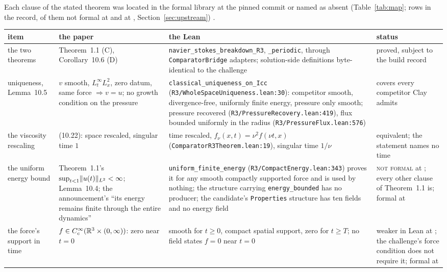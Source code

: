 \documentclass[11pt]{article}
\newcommand{\lean}[1]{\texttt{#1}}
\newcommand{\Lp}[1]{L^{#1}}
\begin{document}
Each clause of the stated theorem was located in the formal library at the pinned commit or
named as absent (Table~\ref{tab:map}; \PaperVsLeanRows{} rows in the record,
\PaperClausesNotFormal{} of them not formal at \lean{\LeanCommit} and
\PaperClausesNotFormalAtHead{} at \lean{\UpCommit}, Section~\ref{sec:upstream}) \cite{Records}.

\begin{table}[t]\centering\footnotesize
\begin{tabular}{L{2.5cm}L{4.0cm}L{5.6cm}L{2.4cm}}\toprule
item & the paper & the Lean & status\\\midrule
the two theorems & Theorem~1.1 (C), Corollary~10.6 (D) & \lean{navier\_stokes\_breakdown\_R3}, \lean{\_periodic}, through \lean{ComparatorBridge} adapters; solution-side definitions byte-identical to the challenge & proved, subject to the build record \\
uniqueness, Lemma~10.5 & $v$ smooth, $\Lp\infty_t\Lp2_x$, zero datum, same force $\Rightarrow v=u$; no growth condition on the pressure & \lean{classical\_uniqueness\_on\_Icc} (\lean{R3/WholeSpaceUniqueness.lean:30}): competitor smooth, divergence-free, uniformly finite energy, pressure only smooth; pressure recovered (\lean{R3/PressureRecovery.lean:419}), flux bounded uniformly in the radius (\lean{R3/PressureFlux.lean:576}) & covers every competitor Clay admits \\
the viscosity rescaling & (10.22): space rescaled, singular time $1$ & time rescaled, $f_\nu(x,t)=\nu^2f(\nu t,x)$ (\lean{ComparatorR3Theorem.lean:19}), singular time $1/\nu$ & equivalent; the statement names no time \\
the uniform energy bound & Theorem~1.1's $\sup_{t<1}\norm{u(t)}_{\Lp2}<\infty$; Lemma~10.4; the announcement's ``its energy remains finite through the entire dynamics'' & \lean{uniform\_finite\_energy} (\lean{R3/CompactEnergy.lean:343}) proves it for any smooth compactly supported force and is used by nothing; the structure carrying \lean{energy\_bounded} has no producer; the candidate's \lean{Properties} structure has ten fields and no energy field & \textsc{not formal} at \lean{\LeanCommit}; every other clause of Theorem~1.1 is; formal at \lean{\UpCommit} \\
the force's support in time & $f\in C_c^\infty(\mathbb{R}^3\times(0,\infty))$: zero near $t=0$ & smooth for $t\ge0$, compact spatial support, zero for $t\ge T$; no field states $f=0$ near $t=0$ & weaker in Lean at \lean{\LeanCommit}; the challenge's force condition does not require it; formal at \lean{\UpCommit} \\

\end{tabular}
\end{table}
\end{document}
